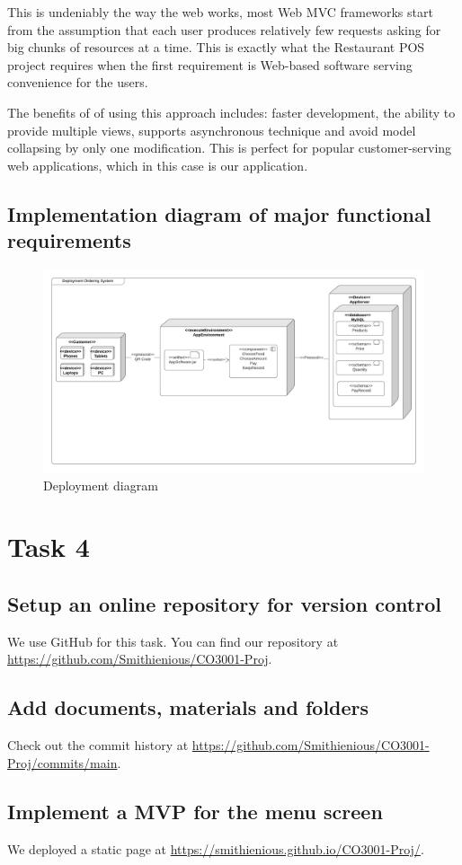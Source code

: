 \documentclass[a4paper]{article}
\numberwithin{equation}{section}
\begin{document}
This is undeniably the way the web works, most Web MVC frameworks start from the assumption that each user produces relatively few requests asking for big chunks of resources at a time.
This is exactly what the Restaurant POS project requires when the first requirement is Web-based software serving convenience for the users.

The benefits of of using this approach includes: faster development, the ability to provide multiple views, supports asynchronous technique and avoid model collapsing by only one modification.
This is perfect for popular customer-serving web applications, which in this case is our application.

\subsection{Implementation diagram of major functional requirements}

\begin{figure}[H]
  \centering
  \includegraphics[width=\textwidth]{./assets/t3/3.2.png}
  \caption{Deployment diagram}
\end{figure}

\newpage

\section{Task 4}
\subsection{Setup an online repository for version control}
We use GitHub for this task.
You can find our repository at \url{https://github.com/Smithienious/CO3001-Proj}.

\subsection{Add documents, materials and folders}
Check out the commit history at \url{https://github.com/Smithienious/CO3001-Proj/commits/main}.

\subsection{Implement a MVP for the menu screen}
We deployed a static page at \url{https://smithienious.github.io/CO3001-Proj/}.
\end{document}
